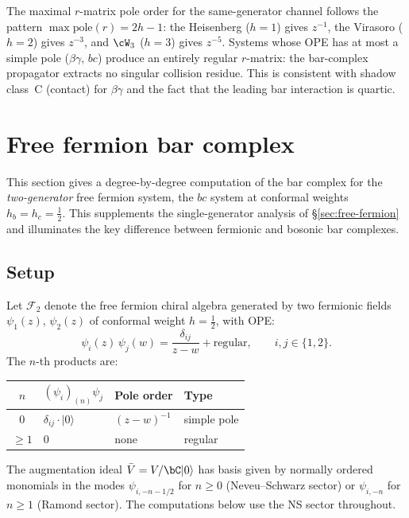 \begin{remark}
\label{rem:pole-hierarchy}
The maximal $r$-matrix pole order for the same-generator channel
follows the pattern $\max\text{pole}(r) = 2h - 1$: the Heisenberg
($h=1$) gives $z^{-1}$, the Virasoro ($h=2$) gives $z^{-3}$, and
$\cW_3$ ($h=3$) gives $z^{-5}$.
Systems whose OPE has at most a simple pole ($\beta\gamma$, $bc$)
produce an entirely regular $r$-matrix: the bar-complex propagator
extracts no singular collision residue. This is consistent with
shadow class~C (contact) for $\beta\gamma$ and the fact that the
leading bar interaction is quartic.
\end{remark}

\section{Free fermion bar complex}
\label{sec:fermion-bar-details}

This section gives a degree-by-degree computation of the bar complex
for the \emph{two-generator} free fermion system, the $bc$ system
at conformal weights $h_b = h_c = \tfrac{1}{2}$.
This supplements the single-generator analysis of
\S\ref{sec:free-fermion} and illuminates the key difference between
fermionic and bosonic bar complexes.

\subsection{Setup}

\begin{computation}
\label{comp:fermion-two-gen-ope}
Let $\mathcal{F}_2$ denote the free fermion chiral algebra generated
by two fermionic fields $\psi_1(z)$, $\psi_2(z)$ of conformal
weight $h = \tfrac{1}{2}$, with OPE:
\begin{equation}\label{eq:fermion-two-gen-ope}
\psi_i(z)\,\psi_j(w) = \frac{\delta_{ij}}{z - w} + \text{regular},
\qquad i, j \in \{1, 2\}.
\end{equation}
The $n$-th products are:
\begin{center}
\renewcommand{\arraystretch}{1.15}
\begin{tabular}{clll}
$n$ & $(\psi_i)_{(n)}\psi_j$ & Pole order & Type \\
\hline
$0$ & $\delta_{ij}\cdot |0\rangle$ & $(z-w)^{-1}$ & simple pole \\
$\geq 1$ & $0$ & none & regular
\end{tabular}
\end{center}
The augmentation ideal $\bar{V} = V/\bC|0\rangle$ has basis given by
normally ordered monomials in the modes
$\psi_{i,-n-1/2}$ for $n \geq 0$ (Neveu--Schwarz sector) or
$\psi_{i,-n}$ for $n \geq 1$ (Ramond sector).
The computations below use the NS sector throughout.
\end{computation}

